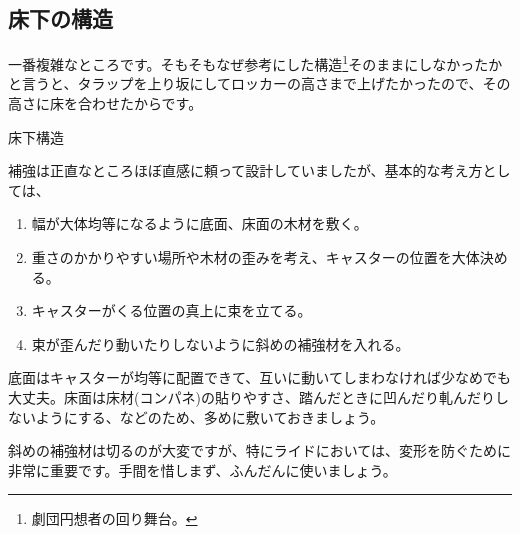 \documentclass[uplatex,dvipdfmx]{jsreport}
\begin{document}
\subsection{床下の構造}

一番複雑なところです。そもそもなぜ参考にした構造\footnote{劇団円想者の回り舞台。}そのままにしなかったかと言うと、タラップを上り坂にしてロッカーの高さまで上げたかったので、その高さに床を合わせたからです。

\begin{imageHere}{床下構造}
\end{imageHere}

補強は正直なところほぼ直感に頼って設計していましたが、基本的な考え方としては、
\begin{enumerate}
    \item 幅が大体均等になるように底面、床面の木材を敷く。
    \item 重さのかかりやすい場所や木材の歪みを考え、キャスターの位置を大体決める。
    \item キャスターがくる位置の真上に束を立てる。
    \item 束が歪んだり動いたりしないように斜めの補強材を入れる。
\end{enumerate}

底面はキャスターが均等に配置できて、互いに動いてしまわなければ少なめでも大丈夫。床面は床材(コンパネ)の貼りやすさ、踏んだときに凹んだり軋んだりしないようにする、などのため、多めに敷いておきましょう。

斜めの補強材は切るのが大変ですが、特にライドにおいては、変形を防ぐために非常に重要です。手間を惜しまず、ふんだんに使いましょう。
\end{document}

